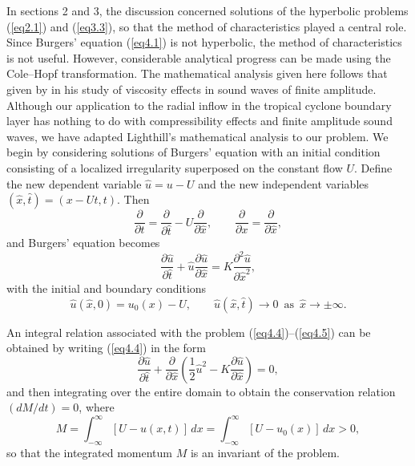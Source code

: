 \documentclass[10pt]{article}
\begin{document}
     In sections 2 and 3, the discussion concerned solutions of the hyperbolic
problems (\ref{eq2.1}) and (\ref{eq3.3}), so that the method of characteristics
played a central role.
Since Burgers' equation (\ref{eq4.1}) is not hyperbolic, the method
of characteristics is not useful. However, considerable analytical progress can
be made using the Cole--Hopf transformation. The mathematical analysis given here
follows that given by \citet{lighthill56}
in his study of viscosity effects in sound waves of finite amplitude.
Although our application to the radial inflow in the tropical cyclone boundary
layer has nothing to do with compressibility effects and finite amplitude sound
waves, we have adapted Lighthill's mathematical analysis to our problem.
We begin by considering solutions of
Burgers' equation with an initial condition consisting of a localized irregularity
superposed on the constant flow $U$. Define the new dependent variable $\hat{u}=u-U$
and the new independent variables $(\hat{x},\hat{t})=(x-Ut,t)$. Then
\begin{equation}                                 %
        \frac{\partial}{\partial t}
      = \frac{\partial}{\partial\hat{t}} - U\frac{\partial}{\partial\hat{x}}, \qquad
        \frac{\partial}{\partial x}
      = \frac{\partial}{\partial\hat{x}},
\label{eq4.3}
\end{equation}
and Burgers' equation becomes
\begin{equation}                                 %
              \frac{\partial\hat{u}}{\partial\hat{t}}
     + \hat{u}\frac{\partial\hat{u}}{\partial\hat{x}}
     = K\frac{\partial^2\hat{u}}{\partial\hat{x}^2},
\label{eq4.4}
\end{equation}
with the initial and boundary conditions
\begin{equation}                                 %
        \hat{u}(\hat{x},0) = u_0(x) - U,  \qquad
        \hat{u}(\hat{x},\hat{t}) \to 0 \,\,\, \text{as}\,\,\, \hat{x} \to \pm\infty.
\label{eq4.5}
\end{equation}

     An integral relation associated with the problem (\ref{eq4.4})--(\ref{eq4.5})
can be obtained by writing (\ref{eq4.4}) in the form
\begin{equation}                                 %
       \frac{\partial\hat{u}}{\partial\hat{t}}
     + \frac{\partial}{\partial\hat{x}}
       \left(\frac{1}{2}\hat{u}^2 - K\frac{\partial\hat{u}}{\partial\hat{x}}\right) = 0,
\label{eq4.6}
\end{equation}
and then integrating over the entire domain to obtain the conservation
relation $(dM/dt)=0$, where
\begin{equation}                                 %
       M = \int_{-\infty}^\infty \left[U-u(x,t)\right] \, dx
	 = \int_{-\infty}^\infty \left[U-u_0(x)\right] \, dx > 0,
\label{eq4.7}
\end{equation}
so that the integrated momentum $M$ is an invariant of the problem.
\end{document}
